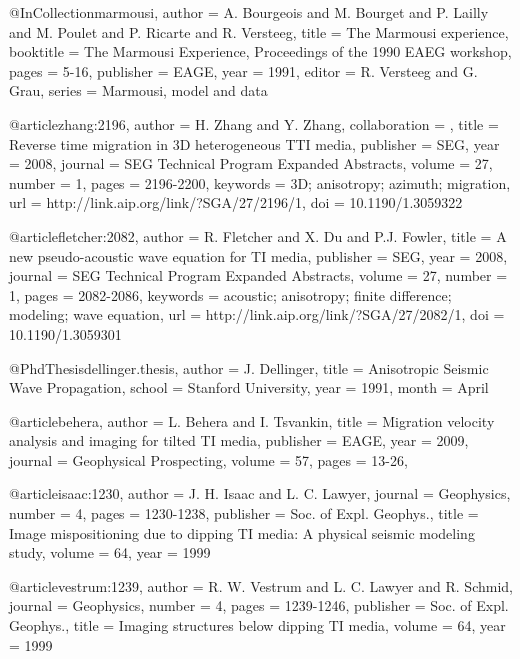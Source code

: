 {@InCollection{marmousi,
  author =	 {A. Bourgeois and M. Bourget and P. Lailly and
                  M. Poulet and P. Ricarte and R. Versteeg},
  title =	 {The {M}armousi experience},
  booktitle =	 {The Marmousi Experience, Proceedings of the 1990
                  EAEG workshop},
  pages =	 {5-16},
  publisher =    {EAGE},
  year =	 1991,
  editor =	 {R. Versteeg and G. Grau},
  series =	 {Marmousi, model and data}
}

@article{zhang:2196,
author = {H. Zhang and Y. Zhang},
collaboration = {},
title = {Reverse time migration in 3{D} heterogeneous {TTI} media},
publisher = {SEG},
year = {2008},
journal = {SEG Technical Program Expanded Abstracts},
volume = {27},
number = {1},
pages = {2196-2200},
keywords = {3D; anisotropy; azimuth; migration},
url = {http://link.aip.org/link/?SGA/27/2196/1},
doi = {10.1190/1.3059322}
}

@article{fletcher:2082,
  author =	 {R. Fletcher and X. Du and P.J. Fowler},
  title =	 {A new pseudo-acoustic wave equation for {TI} media},
  publisher =	 {SEG},
  year =	 2008,
  journal =	 {SEG Technical Program Expanded Abstracts},
  volume =	 27,
  number =	 1,
  pages =	 {2082-2086},
  keywords =	 {acoustic; anisotropy; finite difference; modeling;
                  wave equation},
  url =		 {http://link.aip.org/link/?SGA/27/2082/1},
  doi =		 {10.1190/1.3059301}
}

@PhdThesis{dellinger.thesis,
  author =	 {J. Dellinger},
  title =	 {Anisotropic Seismic Wave Propagation},
  school =	 {Stanford University},
  year =	 1991,
  month =	 {April}
}

@article{behera,
  author =	 {L. Behera and I. Tsvankin},
  title =	 {Migration velocity analysis and imaging for tilted
                  {TI} media},
  publisher =	 {EAGE},
  year =	 2009,
  journal =	 {Geophysical Prospecting},
  volume =	 57,
  pages =	 {13-26},
}

@article{isaac:1230,
  author =	 {J. H. Isaac and L. C. Lawyer},
  journal =	 {Geophysics},
  number =	 4,
  pages =	 {1230-1238},
  publisher =	 {Soc. of Expl. Geophys.},
  title =	 {Image mispositioning due to dipping {TI} media: {A}
                  physical seismic modeling study},
  volume =	 64,
  year =	 1999
}

@article{vestrum:1239,
  author =	 {R. W. Vestrum and L. C. Lawyer and R. Schmid},
  journal =	 {Geophysics},
  number =	 4,
  pages =	 {1239-1246},
  publisher =	 {Soc. of Expl. Geophys.},
  title =	 {Imaging structures below dipping {TI} media},
  volume =	 64,
  year =	 1999
}

}
